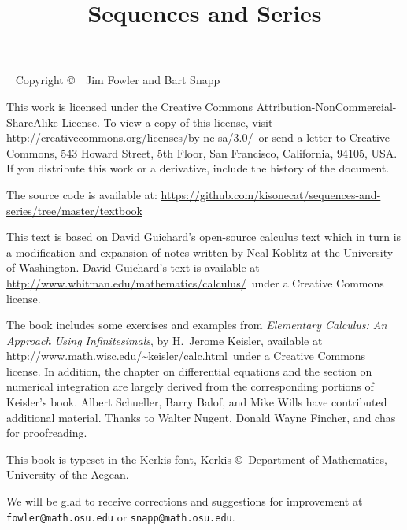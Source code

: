 \documentclass[justified]{tufte-book}
\title{Sequences and Series}
\begin{document}
\frontmatter

\maketitle

\pagebreak


\begin{fullwidth}
~\vfill
\thispagestyle{empty}
\setlength{\parindent}{0pt}
\setlength{\parskip}{\baselineskip}
Copyright \copyright\ \the\year\ Jim Fowler and Bart Snapp

This work is licensed under the Creative Commons
Attribution-NonCommercial-ShareAlike License. To view a copy of this
license, visit
\url{http://creativecommons.org/licenses/by-nc-sa/3.0/}~or send a
letter to Creative Commons, 543 Howard Street, 5th Floor, San
Francisco, California, 94105, USA. If you distribute this work or a
derivative, include the history of the document. 

The source code is available
at: \url{https://github.com/kisonecat/sequences-and-series/tree/master/textbook}

\noindent
This text is based on David Guichard's open-source calculus text which
in turn is a modification and expansion of notes written by Neal
Koblitz at the University of Washington. David Guichard's text is
available at \url{http://www.whitman.edu/mathematics/calculus/}~under a Creative Commons license.

\noindent The book includes some exercises and examples from {\it
  Elementary Calculus: An Approach Using Infinitesimals}, by H.~Jerome
Keisler, available at
\url{http://www.math.wisc.edu/~keisler/calc.html}~under a Creative
Commons license. In addition, the chapter on differential equations
and the section on numerical integration are largely derived from the
corresponding portions of Keisler's book.  Albert Schueller, Barry
Balof, and Mike Wills have contributed additional material.  Thanks to Walter Nugent, Donald Wayne Fincher, and chas for proofreading.

\noindent This book is typeset in the Kerkis font, 
Kerkis \copyright~Department of Mathematics, University of the Aegean.


\noindent We will be glad to receive corrections and suggestions for
improvement at \texttt{fowler@math.osu.edu} or
\texttt{snapp@math.osu.edu}.

\end{fullwidth}
\end{document}
